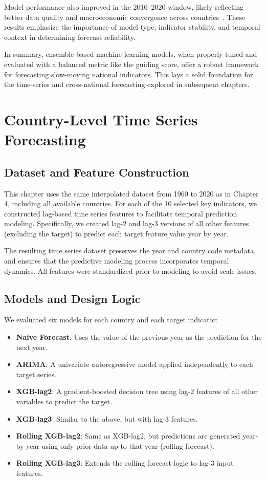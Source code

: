 \documentclass[12pt]{article}
\begin{document}
Model performance also improved in the 2010–2020 window, likely reflecting better data quality and macroeconomic convergence across countries~\cite{Baldwin2016Great, Jerven2013Poor}. These results emphasize the importance of model type, indicator stability, and temporal context in determining forecast reliability.

In summary, ensemble-based machine learning models, when properly tuned and evaluated with a balanced metric like the guiding score, offer a robust framework for forecasting slow-moving national indicators. This lays a solid foundation for the time-series and cross-national forecasting explored in subsequent chapters.


\section{Country-Level Time Series Forecasting}


\subsection{Dataset and Feature Construction}

This chapter uses the same interpolated dataset from 1960 to 2020 as in Chapter 4, including all available countries. For each of the 10 selected key indicators, we constructed lag-based time series features to facilitate temporal prediction modeling. Specifically, we created lag-2 and lag-3 versions of all other features (excluding the target) to predict each target feature value year by year.

The resulting time series dataset preserves the year and country code metadata, and ensures that the predictive modeling process incorporates temporal dynamics. All features were standardized prior to modeling to avoid scale issues.

\subsection{Models and Design Logic}

We evaluated six models for each country and each target indicator:

\begin{itemize}
    \item \textbf{Naive Forecast}: Uses the value of the previous year as the prediction for the next year.
    \item \textbf{ARIMA}: A univariate autoregressive model applied independently to each target series.
    \item \textbf{XGB-lag2}: A gradient-boosted decision tree using lag-2 features of all other variables to predict the target.
    \item \textbf{XGB-lag3}: Similar to the above, but with lag-3 features.
    \item \textbf{Rolling XGB-lag2}: Same as XGB-lag2, but predictions are generated year-by-year using only prior data up to that year (rolling forecast).
    \item \textbf{Rolling XGB-lag3}: Extends the rolling forecast logic to lag-3 input features.
\end{itemize}
\end{document}
